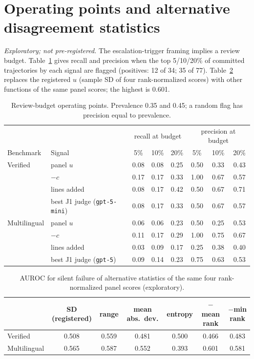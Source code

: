 \documentclass[11pt]{article}
\begin{document}
\section{Operating points and alternative disagreement statistics}
\footnotesize
\emph{Exploratory; not pre-registered.} The escalation-trigger framing implies a review budget. Table~\ref{tab:budget} gives recall and precision when the top 5/10/20\% of committed trajectories by each signal are flagged (positives: 12 of 34; 35 of 77). Table~\ref{tab:altu} replaces the registered $u$ (sample SD of four rank-normalized scores) with other functions of the same panel scores; the highest is 0.601.
\begin{table}[h]\centering\footnotesize
\begin{tabular}{llcccccc}\toprule
& & \multicolumn{3}{c}{recall at budget} & \multicolumn{3}{c}{precision at budget} \\
Benchmark & Signal & 5\% & 10\% & 20\% & 5\% & 10\% & 20\% \\\midrule
Verified & panel $u$ & 0.08 & 0.08 & 0.25 & 0.50 & 0.33 & 0.43 \\
 & $-c$ & 0.17 & 0.17 & 0.33 & 1.00 & 0.67 & 0.57 \\
 & lines added & 0.08 & 0.17 & 0.42 & 0.50 & 0.67 & 0.71 \\
 & best J1 judge (\texttt{gpt-5-mini}) & 0.08 & 0.17 & 0.33 & 0.50 & 0.67 & 0.57 \\
Multilingual & panel $u$ & 0.06 & 0.06 & 0.23 & 0.50 & 0.25 & 0.53 \\
 & $-c$ & 0.11 & 0.17 & 0.29 & 1.00 & 0.75 & 0.67 \\
 & lines added & 0.03 & 0.09 & 0.17 & 0.25 & 0.38 & 0.40 \\
 & best J1 judge (\texttt{gpt-5}) & 0.09 & 0.14 & 0.23 & 0.75 & 0.63 & 0.53 \\\bottomrule
\end{tabular}
\caption{Review-budget operating points. Prevalence 0.35 and 0.45; a random flag has precision equal to prevalence.}\label{tab:budget}\end{table}
\begin{table}[h]\centering\footnotesize
\begin{tabular}{lcccccc}\toprule
& SD (registered) & range & mean abs.\ dev. & entropy & $-$mean rank & $-$min rank \\\midrule
Verified & 0.508 & 0.559 & 0.481 & 0.500 & 0.466 & 0.483 \\
Multilingual & 0.565 & 0.587 & 0.552 & 0.393 & 0.601 & 0.581 \\\bottomrule
\end{tabular}
\caption{AUROC for silent failure of alternative statistics of the same four rank-normalized panel scores (exploratory).}\label{tab:altu}\end{table}
\end{document}
